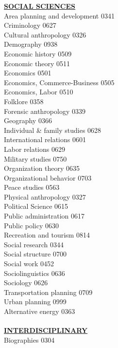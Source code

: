 \documentclass[9pt,twoside]{article}
\newcommand{\categoryheading}[1]{{\fontsize{8}{11}\selectfont \textbf{\uline{#1}}}}
\begin{document}
{\begin{multicols}{3}
\categoryheading{SOCIAL SCIENCES} \\
Area planning and development \hfill 0341 \\
Criminology \hfill 0627 \\
Cultural anthropology \hfill 0326 \\
Demography \hfill 0938 \\
Economic history \hfill 0509 \\
Economic theory \hfill 0511 \\
Economics \hfill 0501 \\
Economics, Commerce-Business \hfill 0505 \\
Economics, Labor \hfill 0510 \\
Folklore \hfill 0358 \\
Forensic anthropology \hfill 0339 \\
Geography \hfill 0366 \\
Individual \& family studies \hfill 0628 \\
International relations \hfill 0601 \\
Labor relations \hfill 0629 \\
Military studies \hfill 0750 \\
Organization theory \hfill 0635 \\
Organizational behavior \hfill 0703 \\
Peace studies \hfill 0563 \\
Physical anthropology \hfill 0327 \\
Political Science \hfill 0615 \\
Public administration \hfill 0617 \\
Public policy \hfill 0630 \\
Recreation and tourism \hfill 0814 \\
Social research \hfill 0344 \\
Social structure \hfill 0700 \\
Social work \hfill 0452 \\
Sociolinguistics \hfill 0636 \\
Sociology \hfill 0626 \\
Transportation planning \hfill 0709 \\
Urban planning \hfill 0999 \\
Alternative energy \hfill 0363 \\
\columnbreak \\
\categoryheading{INTERDISCIPLINARY} \\
Biographies \hfill 0304 \\

\end{multicols}}
\end{document}
